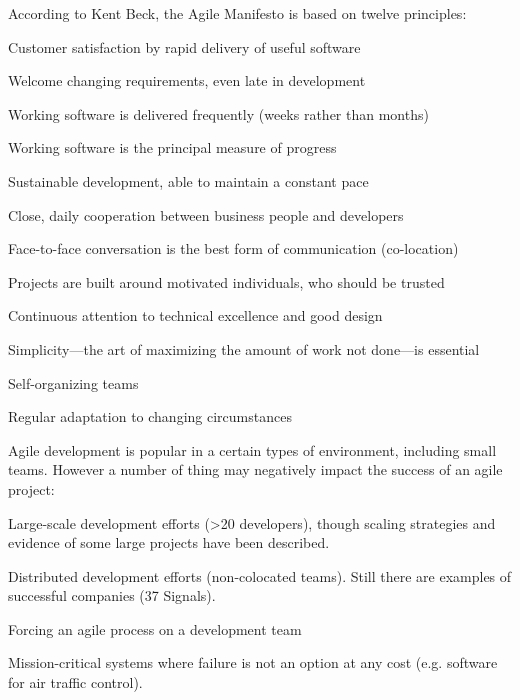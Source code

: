 
According to Kent Beck,\cite{beck} the Agile Manifesto is based on twelve principles:
\begin{compactenum}
\item Customer satisfaction by rapid delivery of useful software
\item Welcome changing requirements, even late in development
\item Working software is delivered frequently (weeks rather than months)
\item Working software is the principal measure of progress
\item Sustainable development, able to maintain a constant pace
\item Close, daily cooperation between business people and developers
\item Face-to-face conversation is the best form of communication (co-location)
\item Projects are built around motivated individuals, who should be trusted
\item Continuous attention to technical excellence and good design
\item Simplicity—the art of maximizing the amount of work not done—is essential
\item Self-organizing teams
\item Regular adaptation to changing circumstances
\end{compactenum}


Agile development is popular in a certain types of environment, including small teams. However a number of thing may negatively impact the success of an agile project:

\begin{compactenum}
\item Large-scale development efforts (\textgreater 20 developers), though scaling strategies \cite{ambler} and evidence of some large projects \cite{schaaf} have been described.
\item Distributed development efforts (non-colocated teams). Still there are examples of successful companies (37 Signals).
\item Forcing an agile process on a development team
\item Mission-critical systems where failure is not an option at any cost (e.g. software for air traffic control).
\end{compactenum}

